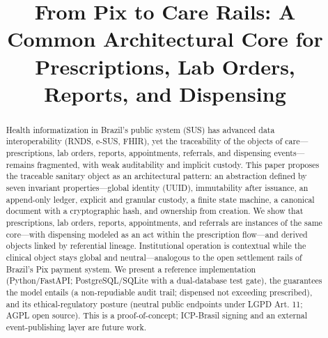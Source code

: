 \documentclass[conference]{IEEEtran}
\begin{document}
\title{From Pix to Care Rails: A Common Architectural Core for Prescriptions, Lab Orders, Reports, and Dispensing}

\author{
}

\maketitle

\begin{abstract}
Health informatization in Brazil's public system (SUS) has advanced data interoperability (RNDS, e-SUS, FHIR), yet the traceability of the objects of care---prescriptions, lab orders, reports, appointments, referrals, and dispensing events---remains fragmented, with weak auditability and implicit custody. This paper proposes the traceable sanitary object as an architectural pattern: an abstraction defined by seven invariant properties---global identity (UUID), immutability after issuance, an append-only ledger, explicit and granular custody, a finite state machine, a canonical document with a cryptographic hash, and ownership from creation. We show that prescriptions, lab orders, reports, appointments, and referrals are instances of the same core---with dispensing modeled as an act within the prescription flow---and derived objects linked by referential lineage. Institutional operation is contextual while the clinical object stays global and neutral---analogous to the open settlement rails of Brazil's Pix payment system. We present a reference implementation (Python/FastAPI; PostgreSQL/SQLite with a dual-database test gate), the guarantees the model entails (a non-repudiable audit trail; dispensed not exceeding prescribed), and its ethical-regulatory posture (neutral public endpoints under LGPD Art. 11; AGPL open source). This is a proof-of-concept; ICP-Brasil signing and an external event-publishing layer are future work.
\end{abstract}
\end{document}
